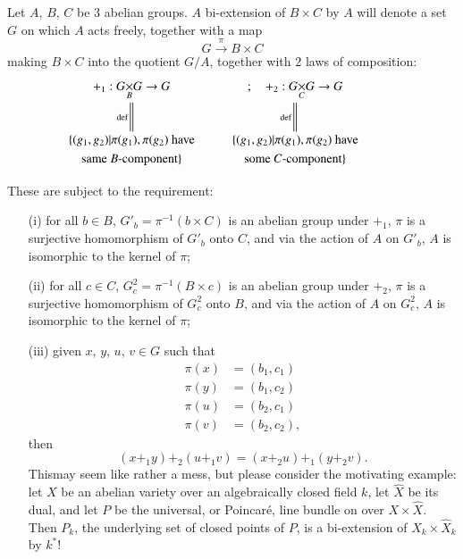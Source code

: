 Let $A$, $B$, $C$ be 3 abelian groups. $A$ bi-extension of $B\times C$ by $A$ will denote a set $G$ on which $A$ acts freely, together with a map
$$
G\xrightarrow{\pi} B\times C
$$
making $B\times C$ into the quotient $G/A$, together with 2 laws of composition:
\[
\xymatrix@R=.01cm{
+_{1}:\fprod{G}{G}{B}\to G\ar@{=}[ddddd]_-{\text{def}} & ;\quad +_{2}:\fprod{G}{G}{C}\to G\ar@{=}[ddddd]_-{\text{def}}\\
 & & \\
 & & \\
 & & \\
 & & \\
\{(g_{1},g_{2})|\pi(g_{1}),\pi(g_{2})\text{~have}  & \{(g_{1},g_{2})|\pi(g_{1}),\pi(g_{2})\text{~have}\\
\text{same $B$-component}\} & \text{some $C$-component}\}
}
\]

\eject

These are subject to the requirement:
\begin{itemize}
\item[(i)] for all $b\in B$, $G'_{b}=\pi^{-1}(b\times C)$ is an abelian group under $+_{1}$, $\pi$ is a surjective homomorphism of $G'_{b}$ onto $C$, and via the action of $A$ on $G'_{b}$, $A$ is isomorphic to the kernel of $\pi$;

\item[(ii)] for all $c\in C$, $G^{2}_{c}=\pi^{-1}(B\times c)$ is an abelian group under $+_{2}$, $\pi$ is a surjective homomorphism of $G^{2}_{c}$ onto $B$, and via the action of $A$ on $G^{2}_{c}$, $A$ is isomorphic to the kernel of $\pi$;

\item[(iii)] given $x$, $y$, $u$, $v\in G$ such that
\begin{align*}
\pi(x) &= (b_{1},c_{1})\\
\pi(y) &= (b_{1},c_{2})\\
\pi(u) &= (b_{2},c_{1})\\
\pi(v) &= (b_{2},c_{2}),
\end{align*}
then 
$$
(x+_{1}y)+_{2}(u+_{1}v)=(x+_{2}u)+_{1}(y+_{2}v).
$$
This\pageoriginale may seem like rather a mess, but please consider the motivating example: let $X$ be an abelian variety over an algebraically closed field $k$, let $\widehat{X}$ be its dual, and let $P$ be the universal, or Poincar\'e, line bundle on over $X\times \widehat{X}$. Then $P_{k}$, the underlying set of closed points of $P$, is a bi-extension of $X_{k}\times \widehat{X}_{k}$ by $k^{*}$!
\end{itemize}

